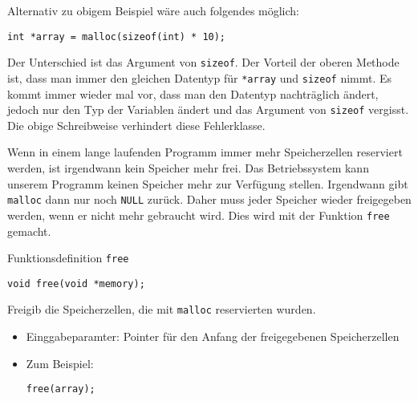 Alternativ zu obigem Beispiel wäre auch folgendes möglich:

\begin{lstlisting}
int *array = malloc(sizeof(int) * 10);
\end{lstlisting}

Der Unterschied ist das Argument von \texttt{sizeof}. Der Vorteil der oberen Methode ist, dass man immer den gleichen Datentyp für \texttt{*array} und \texttt{sizeof} nimmt. Es kommt immer wieder mal vor, dass man den Datentyp nachträglich ändert, jedoch nur den Typ der Variablen ändert und das Argument von \texttt{sizeof} vergisst. Die obige Schreibweise verhindert diese Fehlerklasse.

Wenn in einem lange laufenden Programm immer mehr Speicherzellen reserviert werden, ist irgendwann kein Speicher mehr frei. Das Betriebssystem kann unserem Programm keinen Speicher mehr zur Verfügung stellen. Irgendwann gibt \texttt{malloc} dann nur noch \texttt{NULL} zurück. Daher muss jeder Speicher wieder freigegeben werden, wenn er nicht mehr gebraucht wird. Dies wird mit der Funktion \texttt{free} gemacht.

\begin{myexampleblock}{Funktionsdefinition \texttt{free}}
\begin{lstlisting}
void free(void *memory);
\end{lstlisting}
\vspace{-0.7cm}
Freigib die Speicherzellen, die mit \texttt{malloc} reservierten wurden.
\begin{itemize}
\item Einggabeparamter: Pointer für den Anfang der freigegebenen Speicherzellen
\item Zum Beispiel:
\begin{lstlisting}
free(array);
\end{lstlisting}
\end{itemize}
\vspace{-0.7cm}
\end{myexampleblock}

